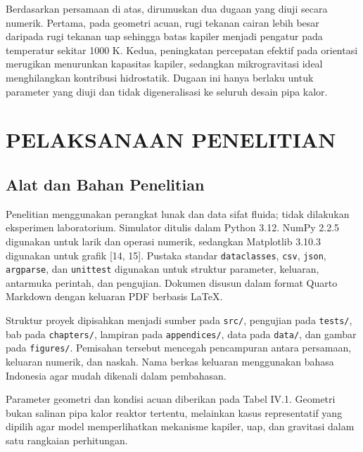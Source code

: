 \documentclass[
  12pt,
  12pt,a4paper,oneside]{report}
\begin{document}
Berdasarkan persamaan di atas, dirumuskan dua dugaan yang diuji secara
numerik. Pertama, pada geometri acuan, rugi tekanan cairan lebih besar
daripada rugi tekanan uap sehingga batas kapiler menjadi pengatur pada
temperatur sekitar 1000 K. Kedua, peningkatan percepatan efektif pada
orientasi merugikan menurunkan kapasitas kapiler, sedangkan
mikrogravitasi ideal menghilangkan kontribusi hidrostatik. Dugaan ini
hanya berlaku untuk parameter yang diuji dan tidak digeneralisasi ke
seluruh desain pipa kalor.

\hypertarget{pelaksanaan-penelitian}{%
\chapter{PELAKSANAAN PENELITIAN}\label{pelaksanaan-penelitian}}

\hypertarget{alat-dan-bahan-penelitian}{%
\section{Alat dan Bahan Penelitian}\label{alat-dan-bahan-penelitian}}

Penelitian menggunakan perangkat lunak dan data sifat fluida; tidak
dilakukan eksperimen laboratorium. Simulator ditulis dalam Python 3.12.
NumPy 2.2.5 digunakan untuk larik dan operasi numerik, sedangkan
Matplotlib 3.10.3 digunakan untuk grafik {[}14, 15{]}. Pustaka standar
\texttt{dataclasses}, \texttt{csv}, \texttt{json}, \texttt{argparse},
dan \texttt{unittest} digunakan untuk struktur parameter, keluaran,
antarmuka perintah, dan pengujian. Dokumen disusun dalam format Quarto
Markdown dengan keluaran PDF berbasis LaTeX.

Struktur proyek dipisahkan menjadi sumber pada \texttt{src/}, pengujian
pada \texttt{tests/}, bab pada \texttt{chapters/}, lampiran pada
\texttt{appendices/}, data pada \texttt{data/}, dan gambar pada
\texttt{figures/}. Pemisahan tersebut mencegah pencampuran antara
persamaan, keluaran numerik, dan naskah. Nama berkas keluaran
menggunakan bahasa Indonesia agar mudah dikenali dalam pembahasan.

Parameter geometri dan kondisi acuan diberikan pada Tabel IV.1. Geometri
bukan salinan pipa kalor reaktor tertentu, melainkan kasus representatif
yang dipilih agar model memperlihatkan mekanisme kapiler, uap, dan
gravitasi dalam satu rangkaian perhitungan.
\end{document}
